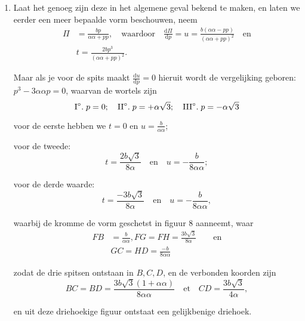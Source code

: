 \documentclass[10pt,a4paper]{article}
\newcommand{\switchenum}{\setcounter{enumi}{\arabic{enumi}-1}\switchcolumn}
\def\D{\mathrm{d}}
\begin{document}
\begin{paracol}{2}
\begin{enumerate}[topsep=1px]
		\switchenum
		\item Laat het genoeg zijn deze in het algemene geval bekend te maken, en laten we eerder een meer bepaalde vorm beschouwen, neem
		\begin{align*}
			\Pi &= \frac{bp}{\alpha \alpha + pp},\quad \text{waardoor} \quad \frac{\D \Pi}{\D p} =u = \frac{b(\alpha\alpha- pp)}{(\alpha\alpha+pp)^2}\quad \text{en}\\
			&t = \frac{2bp^3}{(\alpha \alpha+pp)^2}.
		\end{align*}
		\par Maar als je voor de spits maakt $\frac{\D u}{\D p}=0$ hieruit wordt de vergelijking geboren: $p^3-3\alpha \alpha p = 0$, waarvan de wortels zijn
		\[
			\text{I}\degree.\; p=0;\quad \text{II}\degree.\; p=+\alpha\sqrt{3};\quad  \text{III}\degree.\; p=-\alpha \sqrt{3}
		\]
		\par voor de eerste hebben we $t=0$ en $u=\frac{b}{\alpha \alpha}$;
		\par voor de tweede:
		\[
			t = \frac{2b\sqrt{3}}{8\alpha} \quad \text{en} \quad u = -\frac{b}{8\alpha \alpha};
		\]
		\par voor de derde waarde:
		\[
			t = \frac{-3b\sqrt{3}}{8\alpha} \quad \text{en} \quad u = -\frac{b}{8\alpha \alpha},
		\]
		\par waarbij de kromme de vorm geschetst in figuur 8 aanneemt, waar
		\begin{align*}
			FB &= \frac{b}{\alpha\alpha}, FG = FH = \frac{3b\sqrt{3}}{8\alpha} \qquad\text{en}\\
			&GC=HD=\frac{-b}{8\alpha \alpha}
		\end{align*}
		\par zodat de drie spitsen ontstaan in $B, C, D$, en de verbonden koorden zijn
		\[
			BC = BD = \frac{3b\sqrt{3}(1+ \alpha \alpha)}{8\alpha \alpha} \quad \text{et} \quad CD = \frac{3b\sqrt{3}}{4\alpha},
		\]
		\par en uit deze driehoekige figuur ontstaat een gelijkbenige driehoek.
		
		\switchcolumn*
		

\end{enumerate}
\end{paracol}
\end{document}
